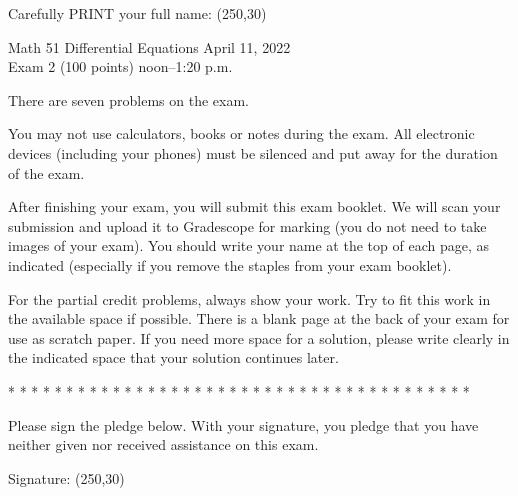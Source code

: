 \documentclass[12pt]{article}
\begin{document}
\noindent
Carefully PRINT your full name:  \framebox(250,30){}


\begin{center}
Math 51 \hfill Differential Equations \hfill April 11, 2022\\
\phantom{noon--1:20 p.m.} \hfill Exam 2 (100 points) \hfill noon--1:20 p.m.
\end{center}

\medskip

There are seven problems on the exam.

You may not use calculators, books or notes during the exam. All electronic devices (including
your phones) must be silenced and put away for the duration of the
exam.

After finishing your exam, you will submit this exam booklet. We will scan your submission and
upload it to Gradescope for marking (you do not need to take images of your exam). You should
write your name at the top of each page, as indicated (especially if you remove the staples from
your exam booklet).

For the partial credit problems, always show your work. Try to fit this work in the available space
if possible. There is a blank page at the back of your exam for use as scratch paper. If you need
more space for a solution, please write clearly in the indicated space that your solution continues
later.

* * * * * * * * * * * * * * * * * * * * * * * * * * * * * * * * * * *
* * * * *

Please sign the pledge below. With your signature, you pledge that
you have neither given nor received assistance on this exam.


\bigskip
\bigskip
Signature:  \framebox(250,30){}

\newpage
\end{document}
